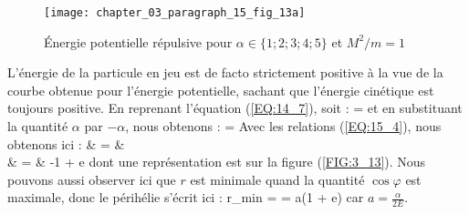 \begin{figure}[htb!]
	\begin{center}
		\texttt{[image: chapter\_03\_paragraph\_15\_fig\_13a]}
		\caption{\'Energie potentielle r\'epulsive pour $\alpha\in \{1;2;3;4;5\}$ et $M^{2}/m = 1$}\label{FIG:3_13a}
	\end{center}
\end{figure}

L'\'energie de la particule en jeu est de facto strictement positive \`a la vue de la courbe obtenue pour l'\'energie potentielle, sachant que l'\'energie cin\'etique est toujours positive. En reprenant l'\'equation (\ref{EQ:14_7}), soit :
\be
	\varphi = 
\ee
et en substituant la quantit\'e $\alpha$ par $-\alpha$, nous obtenons :
\be
	\cos\varphi = 
\ee
Avec les relations (\ref{EQ:15_4}), nous obtenons ici :
\bea
	\cos\varphi & = &  \nonumber \\
	 & = & -1 + e\cos\varphi \label{EQ:15_14}
\eea
dont une repr\'esentation est sur la figure (\ref{FIG:3_13}). Nous pouvons aussi observer ici que $r$ est minimale quand la quantit\'e $\cos\varphi$ est maximale, donc le p\'erih\'elie s'\'ecrit ici :
\be
	r_{min} =  = a(1 + e) \label{EQ:15_15}
\ee
car $a = \frac{\alpha}{2E}$.

